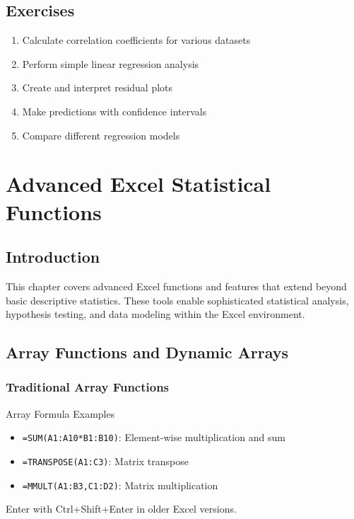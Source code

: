 \documentclass[12pt,a4paper]{book}
\begin{document}
{\section{Exercises}

\begin{enumerate}
    \item Calculate correlation coefficients for various datasets
    \item Perform simple linear regression analysis
    \item Create and interpret residual plots
    \item Make predictions with confidence intervals
    \item Compare different regression models
\end{enumerate}

\chapter{Advanced Excel Statistical Functions}

\section{Introduction}

This chapter covers advanced Excel functions and features that extend beyond basic descriptive statistics. These tools enable sophisticated statistical analysis, hypothesis testing, and data modeling within the Excel environment.

\section{Array Functions and Dynamic Arrays}

\subsection{Traditional Array Functions}

\begin{example}{Array Formula Examples}
\begin{itemize}
    \item \texttt{=SUM(A1:A10*B1:B10)}: Element-wise multiplication and sum
    \item \texttt{=TRANSPOSE(A1:C3)}: Matrix transpose
    \item \texttt{=MMULT(A1:B3,C1:D2)}: Matrix multiplication
\end{itemize}
Enter with Ctrl+Shift+Enter in older Excel versions.
\end{example}

}
\end{document}

